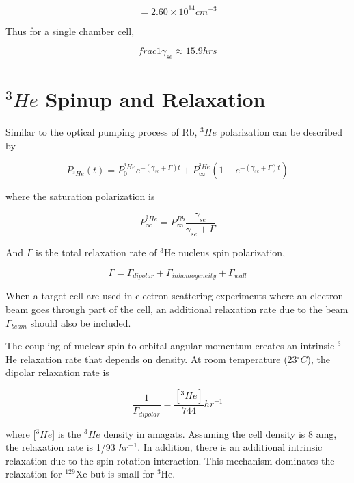\begin{equation}
[Rb]=2.60\times 10^{14}cm^{-3}
\end{equation}

Thus for a single chamber cell,

\begin{equation}
frac{1}{\gamma_{se}}\approx 15.9 hrs
\end{equation}

\section{$^{3}He$ Spinup and Relaxation}

Similar to the optical pumping process of Rb, $^{3}He$ polarization can be described by

\begin{equation}
P_{^{3}He}(t)=P_{0}^{^{3}He}e^{-(\gamma_{se}+\Gamma)t}+P_{\infty}^{^{3}He}(1-e^{-(\gamma_{se}+\Gamma)t})
\end{equation}

where the saturation polarization is

\begin{equation}
P_{\infty}^{^{3}He}=P_{\infty}^{Rb}\frac{\gamma_{se}}{\gamma_{se}+\Gamma}
\end{equation}

And $\Gamma$ is the total relaxation rate of $^{3}$He nucleus spin polarization,

\begin{equation}
\Gamma=\Gamma_{dipolar}+\Gamma_{inhomogeneity}+\Gamma_{wall}
\end{equation}

When a target cell are used in electron scattering experiments where an electron beam goes through part of the cell, an additional relaxation rate due to the beam $\Gamma_{beam}$ should also be included.

The coupling of nuclear spin to orbital angular momentum creates an intrinsic $^{3}$He relaxation rate that depends on density. At room temperature (23$^{\circ}C$), the dipolar relaxation rate is 

\begin{equation}
\frac{1}{\Gamma_{dipolar}}=\frac{[^{3}He]}{744}hr^{-1}
\end{equation}


where [$^{3}He$] is the $^{3}He$ density in amagats. Assuming the cell density is 8 amg, the relaxation rate is 1/93 $hr^{-1}$. In addition, there is an additional intrinsic relaxation due to the spin-rotation interaction. This mechanism dominates the relaxation for $^{129}$Xe but is small for $^{3}$He. 

